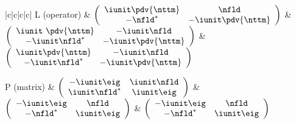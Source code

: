 \begin{table*}[p]
\begin{tabu}{|c|c|c|c|}
        L (operator) &
        $\left( \begin{array}{cc} \iunit \pdv{\nttm} &
          \nfld  \\ - \nfld^* & -\iunit \pdv{\nttm} \end{array}\right)$ &
        $\left( \begin{array}{cc} \iunit \ \pdv{\nttm} & -\iunit \nfld
          \\ -\iunit \nfld^* & -\iunit \pdv{\nttm} \end{array}\right)$ &
        $\left( \begin{array}{cc} \iunit \pdv{\nttm} & -\iunit \nfld
          \\ -\iunit \nfld^* & -\iunit \pdv{\nttm} \end{array}\right)$
        \\ \hline


        P (matrix) &
        $\left( \begin{array}{cc} -\iunit\eig &
          \iunit \nfld  \\
          \iunit\nfld^* &
          \iunit\eig \end{array}\right)$ &
        $\left( \begin{array}{cc} -\iunit\eig &
          \nfld  \\
          - \nfld^* &
          \iunit\eig \end{array}\right)$ &
        $\left( \begin{array}{cc} -\iunit\eig &
          \nfld  \\
          - \nfld^* &
          \iunit\eig \end{array}\right)$
        \\ \hline


\end{tabu}
\end{table*}
